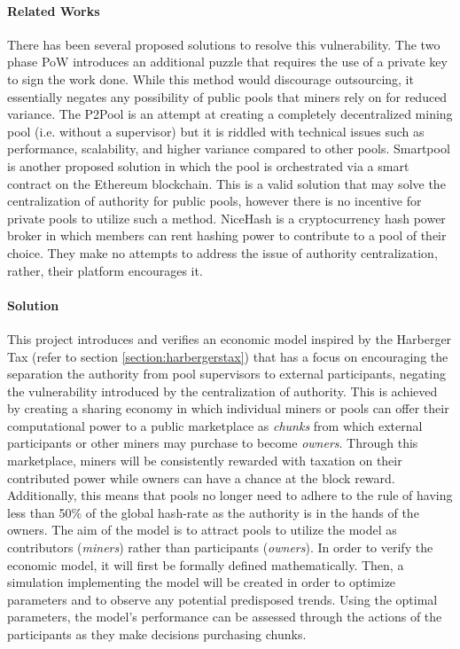 \paragraph{Related Works} There has been several proposed solutions to resolve this vulnerability. The two phase PoW \cite{bastiaan2015} introduces an additional puzzle that requires the use of a private key to sign the work done. While this method would discourage outsourcing, it essentially negates any possibility of public pools that miners rely on for reduced variance. The P2Pool is an attempt at creating a completely decentralized mining pool (i.e. without a supervisor) but it is riddled with technical issues such as performance, scalability, and higher variance compared to other pools. Smartpool \cite{smartpool2017} is another proposed solution in which the pool is orchestrated via a smart contract on the Ethereum blockchain. This is a valid solution that may solve the centralization of authority for public pools, however there is no incentive for private pools to utilize such a method. NiceHash is a cryptocurrency hash power broker in which members can rent hashing power to contribute to a pool of their choice. They make no attempts to address the issue of authority centralization, rather, their platform encourages it.

\paragraph{Solution} This project introduces and verifies an economic model inspired by the Harberger Tax \cite{posnerweyl2017} (refer to section \ref{section:harbergerstax}) that has a focus on encouraging the separation the authority from pool supervisors to external participants, negating the vulnerability introduced by the centralization of authority. This is achieved by creating a sharing economy in which individual miners or pools can offer their computational power to a public marketplace as \textit{chunks} from which external participants or other miners may purchase to become \textit{owners}. Through this marketplace, miners will be consistently rewarded with taxation on their contributed power while owners can have a chance at the block reward. Additionally, this means that pools no longer need to adhere to the rule of having less than 50\% of the global hash-rate as the authority is in the hands of the owners. The aim of the model is to attract pools to utilize the model as contributors (\textit{miners}) rather than participants (\textit{owners}). In order to verify the economic model, it will first be formally defined mathematically. Then, a simulation implementing the model will be created in order to optimize parameters and to observe any potential predisposed trends. Using the optimal parameters, the model's performance can be assessed through the actions of the participants as they make decisions purchasing chunks.
